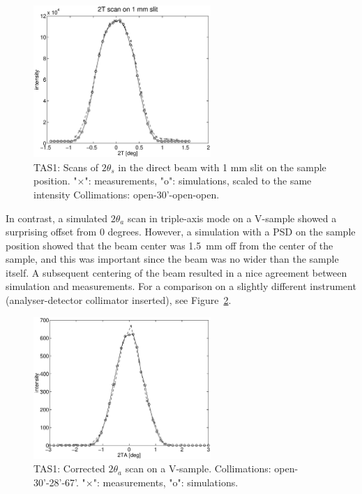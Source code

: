 \begin{figure}
  \begin{center}
    \includegraphics[width=0.6\textwidth]{figures/tas1-2T.eps}
  \end{center}
\caption{TAS1: Scans of $2\theta_s$ in the direct beam with 1 mm slit on the
  sample position.
"$\times$": measurements, "o": simulations, scaled to the same intensity  
Collimations: open-30'-open-open.}
\label{f:2t_direct}
\end{figure}

In contrast, a simulated $2\theta_a$ scan in triple-axis 
mode on a V-sample showed a surprising offset from 0 degrees.
However, a simulation with a PSD
on the sample position showed that the beam center was 1.5~mm
off from the center of the sample, and this was important
since the beam was no wider than the sample itself.
A subsequent centering of the beam resulted in a nice
agreement between simulation and measurements. 
For a comparison on a slightly different instrument
(analyser-detector collimator inserted), 
see Figure~\ref{f:v_2ta_zero}.


\begin{figure}
  \begin{center}
    \includegraphics[width=0.6\textwidth]{figures/vanadium-plot-2.eps}
  \end{center}
\caption{TAS1: Corrected $2\theta_a$ scan on a V-sample.
Collimations: open-30'-28'-67'.
"$\times$": measurements, "o": simulations.}
\label{f:v_2ta_zero}
\end{figure}

